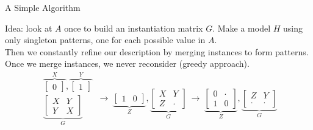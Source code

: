 \documentclass[11pt]{beamer}
\begin{document}

\begin{frame}{A Simple Algorithm}

Idea: look at $A$ once to build an instantiation matrix $G$. Make a model $H$ using only singleton patterns, one for each possible value in $A$.\\[1em]

Then we constantly refine our description by merging instances to form patterns. Once we merge instances, we never reconsider (greedy approach).\\[1em]

\tiny
$$
\begin{matrix}\overbrace{\begin{bmatrix}0\end{bmatrix}}^{X},\overbrace{\begin{bmatrix}1\end{bmatrix}}^{Y}\\[1em]\underbrace{\begin{bmatrix}X & Y \\Y & X\end{bmatrix}}_{G}\end{matrix}\ \longrightarrow
\ \underbrace{\begin{bmatrix}1 &0\end{bmatrix}}_{Z},\underbrace{\begin{bmatrix}X & Y \\Z & \cdot\end{bmatrix}}_{G}
\ \longrightarrow
\ \underbrace{\begin{bmatrix}0 & \cdot \\ 1 & 0\end{bmatrix}}_{Z},\underbrace{\begin{bmatrix}Z & Y \\ \cdot & \cdot\end{bmatrix}}_{G}
$$

\end{frame}

\end{document}
